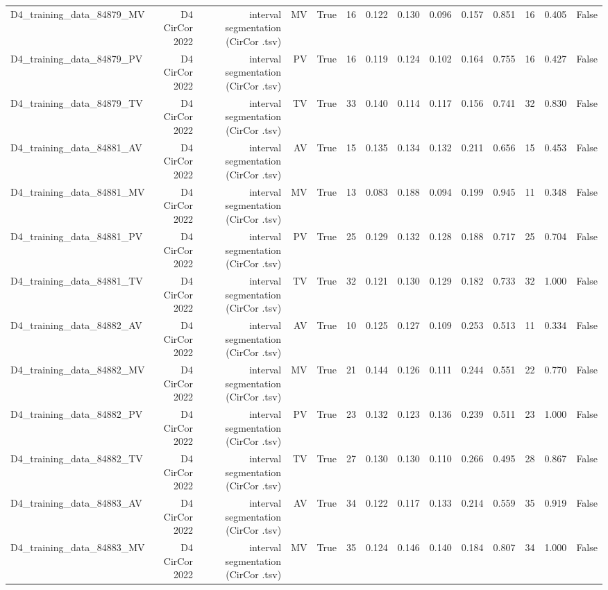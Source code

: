 \begin{table}[htbp]
\begin{tabular}{lrrrrrrrrrrrrr}
    D4\_training\_data\_84879\_MV & D4 CirCor 2022 & interval segmentation (CirCor .tsv) & MV & True & 16 & 0.122 & 0.130 & 0.096 & 0.157 & 0.851 & 16 & 0.405 & False \\
    D4\_training\_data\_84879\_PV & D4 CirCor 2022 & interval segmentation (CirCor .tsv) & PV & True & 16 & 0.119 & 0.124 & 0.102 & 0.164 & 0.755 & 16 & 0.427 & False \\
    D4\_training\_data\_84879\_TV & D4 CirCor 2022 & interval segmentation (CirCor .tsv) & TV & True & 33 & 0.140 & 0.114 & 0.117 & 0.156 & 0.741 & 32 & 0.830 & False \\
    D4\_training\_data\_84881\_AV & D4 CirCor 2022 & interval segmentation (CirCor .tsv) & AV & True & 15 & 0.135 & 0.134 & 0.132 & 0.211 & 0.656 & 15 & 0.453 & False \\
    D4\_training\_data\_84881\_MV & D4 CirCor 2022 & interval segmentation (CirCor .tsv) & MV & True & 13 & 0.083 & 0.188 & 0.094 & 0.199 & 0.945 & 11 & 0.348 & False \\
    D4\_training\_data\_84881\_PV & D4 CirCor 2022 & interval segmentation (CirCor .tsv) & PV & True & 25 & 0.129 & 0.132 & 0.128 & 0.188 & 0.717 & 25 & 0.704 & False \\
    D4\_training\_data\_84881\_TV & D4 CirCor 2022 & interval segmentation (CirCor .tsv) & TV & True & 32 & 0.121 & 0.130 & 0.129 & 0.182 & 0.733 & 32 & 1.000 & False \\
    D4\_training\_data\_84882\_AV & D4 CirCor 2022 & interval segmentation (CirCor .tsv) & AV & True & 10 & 0.125 & 0.127 & 0.109 & 0.253 & 0.513 & 11 & 0.334 & False \\
    D4\_training\_data\_84882\_MV & D4 CirCor 2022 & interval segmentation (CirCor .tsv) & MV & True & 21 & 0.144 & 0.126 & 0.111 & 0.244 & 0.551 & 22 & 0.770 & False \\
    D4\_training\_data\_84882\_PV & D4 CirCor 2022 & interval segmentation (CirCor .tsv) & PV & True & 23 & 0.132 & 0.123 & 0.136 & 0.239 & 0.511 & 23 & 1.000 & False \\
    D4\_training\_data\_84882\_TV & D4 CirCor 2022 & interval segmentation (CirCor .tsv) & TV & True & 27 & 0.130 & 0.130 & 0.110 & 0.266 & 0.495 & 28 & 0.867 & False \\
    D4\_training\_data\_84883\_AV & D4 CirCor 2022 & interval segmentation (CirCor .tsv) & AV & True & 34 & 0.122 & 0.117 & 0.133 & 0.214 & 0.559 & 35 & 0.919 & False \\
    D4\_training\_data\_84883\_MV & D4 CirCor 2022 & interval segmentation (CirCor .tsv) & MV & True & 35 & 0.124 & 0.146 & 0.140 & 0.184 & 0.807 & 34 & 1.000 & False \\

\end{tabular}
\end{table}
